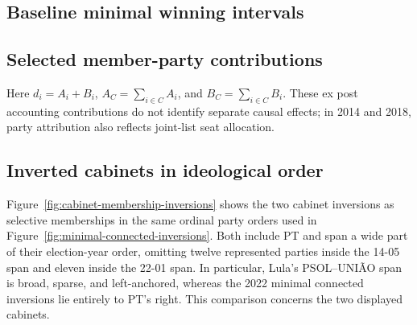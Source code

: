 \documentclass[11pt]{article}
\begin{document}
\subsection{Baseline minimal winning intervals}
\label{app:minimal-connected-winning}



\subsection{Selected member-party contributions}
\label{app:party-contributions}

Here \(d_i=A_i+B_i\), \(A_C=\sum_{i\in C}A_i\), and
\(B_C=\sum_{i\in C}B_i\). These ex post accounting contributions do not
identify separate causal effects; in 2014 and 2018, party attribution also
reflects joint-list seat allocation.



\clearpage
\subsection{Inverted cabinets in ideological order}
\label{app:cabinet-interval-bridge}

Figure~\ref{fig:cabinet-membership-inversions} shows the two cabinet inversions
as selective memberships in the same ordinal party orders used in
Figure~\ref{fig:minimal-connected-inversions}. Both include PT and span a wide
part of their election-year order, omitting twelve represented parties inside
the 14-05 span and eleven inside the 22-01 span. In particular, Lula's
PSOL--UNIÃO span is broad, sparse, and left-anchored, whereas the 2022 minimal
connected inversions lie entirely to PT's right. This comparison concerns the
two displayed cabinets.

\end{document}

